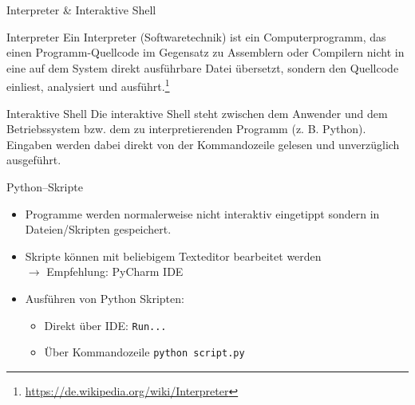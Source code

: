 \documentclass[utf8, smaller, c]{beamer}
\begin{document}
\begin{frame}{Interpreter \& Interaktive Shell}
	\begin{block}{Interpreter}
		Ein Interpreter (Softwaretechnik) ist ein Computerprogramm, das einen
		Programm-Quellcode im Gegensatz zu Assemblern oder Compilern nicht in eine auf dem
		System direkt ausführbare Datei übersetzt, sondern den Quellcode einliest,
		analysiert und ausführt.\footnote{\url{https://de.wikipedia.org/wiki/Interpreter}}
	\end{block}
	\vspace{-2mm}
	\begin{block}{Interaktive Shell}
		Die interaktive Shell steht zwischen dem Anwender und dem Betriebssystem bzw. dem
		zu interpretierenden Programm (z. B. Python). Eingaben werden dabei direkt von der
		Kommandozeile gelesen und unverzüglich ausgeführt. 
	\end{block}
\end{frame}

\begin{frame}[fragile]{Python--Skripte}
	\begin{itemize}
		\item Programme werden normalerweise nicht interaktiv eingetippt sondern in 
		Dateien/Skripten gespeichert.
		\item Skripte können mit beliebigem Texteditor bearbeitet werden\\$\longrightarrow$
		Empfehlung: PyCharm IDE
		\item Ausführen von Python Skripten:
		\begin{itemize}
			\item Direkt über IDE: \verb|Run...|
			\item Über Kommandozeile \verb|python script.py|
		\end{itemize}
	\end{itemize}
	
\end{frame}

\end{document}
